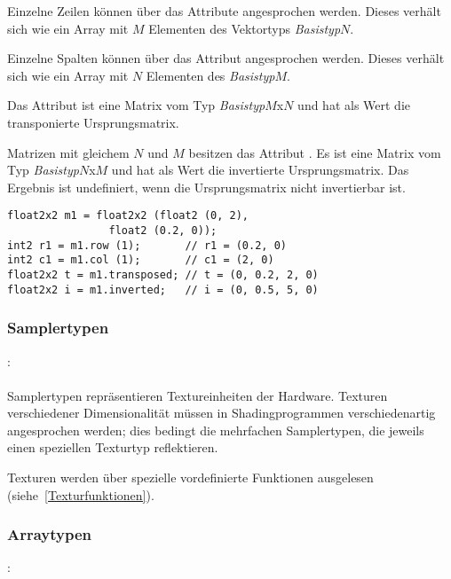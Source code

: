 Einzelne Zeilen können über das Attribute  angesprochen werden. Dieses
verhält sich wie ein Array mit $M$ Elementen des Vektortyps \emph{Basistyp}$N$.

Einzelne Spalten können über das Attribut  angesprochen werden. Dieses
verhält sich wie ein Array mit $N$ Elementen des \emph{Basistyp}$M$.

Das Attribut  ist eine Matrix vom Typ \emph{Basistyp}$M$x$N$
und hat als Wert die transponierte Ursprungsmatrix.

Matrizen mit gleichem $N$ und $M$ besitzen das Attribut .
Es ist eine Matrix vom Typ \emph{Basistyp}$N$x$M$ und hat als Wert die invertierte Ursprungsmatrix.
Das Ergebnis ist undefiniert, wenn die Ursprungsmatrix nicht invertierbar ist.
\begin{lstlisting}
float2x2 m1 = float2x2 (float2 (0, 2),
		        float2 (0.2, 0));
int2 r1 = m1.row (1);       // r1 = (0.2, 0)
int2 c1 = m1.col (1);       // c1 = (2, 0)
float2x2 t = m1.transposed; // t = (0, 0.2, 2, 0)
float2x2 i = m1.inverted;   // i = (0, 0.5, 5, 0)
\end{lstlisting}

\subsubsection{Samplertypen}\label{Samplertypen}
:\label{typ_sampler}\\
\hspace*{1cm}\\

Samplertypen repräsentieren Textureinheiten der Hardware. Texturen verschiedener
Dimensionalität müssen in Shadingprogrammen verschiedenartig angesprochen werden;
dies bedingt die mehrfachen Samplertypen, die jeweils einen speziellen Texturtyp
reflektieren.

Texturen werden über spezielle vordefinierte Funktionen ausgelesen (siehe~\ref{Texturfunktionen}).


\subsubsection{Arraytypen}\label{Arraytypen}
:\label{typ_suffix_array}\\
\hspace*{1cm}\Gt{[}\Gspace\Gt{]}\Gspace{}\\

